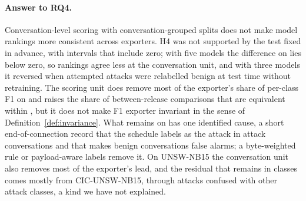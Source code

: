 \paragraph{Answer to RQ4.} Conversation-level scoring with conversation-grouped splits does not make model rankings more consistent across exporters. H4 was not supported by the test fixed in advance, with intervals that include zero; with five models the difference on \cicids{} lies below zero, so rankings agree less at the conversation unit, and with three models it reversed when attempted attacks were relabelled benign at test time without retraining. The scoring unit does remove most of the exporter's share of per-class F1 on \cicids{} and raises the share of between-release comparisons that are equivalent within , but it does not make F1 exporter invariant in the sense of Definition~\ref{def:invariance}. What remains on \cicids{} has one identified cause, a short end-of-connection record that the schedule labels as the attack in attack conversations and that makes benign conversations false alarms; a byte-weighted rule or payload-aware labels remove it. On UNSW-NB15 the conversation unit also removes most of the exporter's lead, and the residual that remains in \RQfourLargeUnsw{} classes comes mostly from CIC-UNSW-NB15, through attacks confused with other attack classes, a kind we have not explained.
